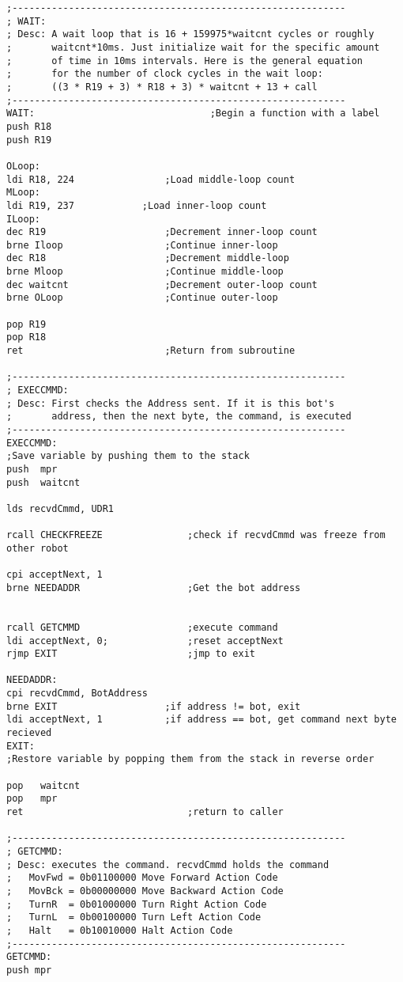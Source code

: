 \documentclass[12pt,letterpaper]{article}
\begin{document}
\begin{verbatim}
;-----------------------------------------------------------
; WAIT: 
; Desc: A wait loop that is 16 + 159975*waitcnt cycles or roughly
; 		waitcnt*10ms. Just initialize wait for the specific amount
; 		of time in 10ms intervals. Here is the general equation
; 		for the number of clock cycles in the wait loop:
;		((3 * R19 + 3) * R18 + 3) * waitcnt + 13 + call
;-----------------------------------------------------------
WAIT:								;Begin a function with a label
push R18
push R19

OLoop:
ldi R18, 224				;Load middle-loop count
MLoop:
ldi R19, 237  			;Load inner-loop count
ILoop:
dec R19  					;Decrement inner-loop count
brne Iloop 					;Continue inner-loop
dec R18 	 				;Decrement middle-loop
brne Mloop 					;Continue middle-loop
dec waitcnt 	 			;Decrement outer-loop count
brne OLoop 					;Continue outer-loop

pop R19
pop R18
ret 						;Return from subroutine

;-----------------------------------------------------------
; EXECCMMD: 
; Desc: First checks the Address sent. If it is this bot's
;		address, then the next byte, the command, is executed
;-----------------------------------------------------------
EXECCMMD:
;Save variable by pushing them to the stack
push  mpr
push  waitcnt

lds recvdCmmd, UDR1

rcall CHECKFREEZE				;check if recvdCmmd was freeze from other robot	

cpi acceptNext, 1			
brne NEEDADDR					;Get the bot address


rcall GETCMMD					;execute command
ldi	acceptNext, 0;				;reset acceptNext
rjmp EXIT						;jmp to exit

NEEDADDR:
cpi recvdCmmd, BotAddress
brne EXIT					;if address != bot, exit
ldi	acceptNext, 1			;if address == bot, get command next byte recieved
EXIT:
;Restore variable by popping them from the stack in reverse order

pop   waitcnt
pop   mpr
ret								;return to caller

;-----------------------------------------------------------
; GETCMMD: 
; Desc: executes the command. recvdCmmd holds the command
;	MovFwd = 0b01100000 Move Forward Action Code
;	MovBck = 0b00000000 Move Backward Action Code
;	TurnR  = 0b01000000 Turn Right Action Code
;	TurnL  = 0b00100000 Turn Left Action Code
;	Halt   = 0b10010000 Halt Action Code
;-----------------------------------------------------------
GETCMMD:
push mpr


\end{verbatim}
\end{document}
